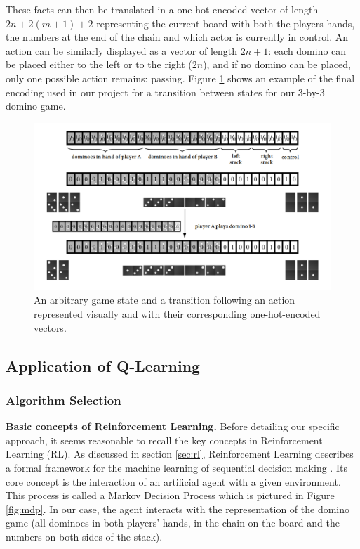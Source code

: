 \documentclass[12pt,a4paper]{article}
\begin{document}
These facts can then be translated in a one hot encoded vector of length $2n+2(m+1)+2$ representing the current board with both the players hands, the numbers at the end of the chain and which actor is currently in control. An action can be similarly displayed as a vector of length $2n+1$: each domino can be placed either to the left or to the right ($2n$), and if no domino can be placed, only one possible action remains: passing. 
Figure \ref{fig:encoding} shows an example of the final encoding used in our project for a transition between states for our 3-by-3 domino game.

\begin{figure}
  \includegraphics[width=\linewidth]{img/encoding.png}
  \caption{An arbitrary game state and a transition following an action represented visually and with their corresponding one-hot-encoded vectors.}
  \label{fig:encoding}
\end{figure}

\subsection{Application of Q-Learning}
\subsubsection{Algorithm Selection}
\textbf{Basic concepts of Reinforcement Learning.}
Before detailing our specific approach, it seems reasonable to recall the key concepts in Reinforcement Learning (RL). As discussed in section \ref{sec:rl}, Reinforcement Learning describes a formal framework for the machine learning of sequential decision making \citep{francois-lavet_introduction_2018}. Its core concept is the interaction of an artificial agent with a given environment. This process is called a Markov Decision Process which is pictured in Figure \ref{fig:mdp}. In our case, the agent interacts with the representation of the domino game (all dominoes in both players' hands, in the chain on the board and the numbers on both sides of the stack).
\end{document}
